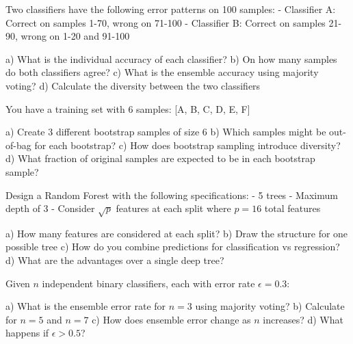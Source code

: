 \documentclass{article}
\newcounter{exercise}
\begin{document}
\begin{tcolorbox}[colback=gray!5!white,colframe=gray!75!black,title=Problem \stepcounter{exercise}: Diversity Analysis]

Two classifiers have the following error patterns on 100 samples:
- Classifier A: Correct on samples 1-70, wrong on 71-100
- Classifier B: Correct on samples 21-90, wrong on 1-20 and 91-100

a) What is the individual accuracy of each classifier?
b) On how many samples do both classifiers agree?
c) What is the ensemble accuracy using majority voting?
d) Calculate the diversity between the two classifiers
\end{tcolorbox}

\begin{tcolorbox}[colback=gray!5!white,colframe=gray!75!black,title=Problem \stepcounter{exercise}: Bootstrap Sampling]

You have a training set with 6 samples: [A, B, C, D, E, F]

a) Create 3 different bootstrap samples of size 6
b) Which samples might be out-of-bag for each bootstrap?
c) How does bootstrap sampling introduce diversity?
d) What fraction of original samples are expected to be in each bootstrap sample?
\end{tcolorbox}

\begin{tcolorbox}[colback=gray!5!white,colframe=gray!75!black,title=Problem \stepcounter{exercise}: Random Forest Construction]

Design a Random Forest with the following specifications:
- 5 trees
- Maximum depth of 3
- Consider $\sqrt{p}$ features at each split where $p=16$ total features

a) How many features are considered at each split?
b) Draw the structure for one possible tree
c) How do you combine predictions for classification vs regression?
d) What are the advantages over a single deep tree?
\end{tcolorbox}

\begin{tcolorbox}[colback=gray!5!white,colframe=gray!75!black,title=Problem \stepcounter{exercise}: Ensemble Error Analysis]

Given $n$ independent binary classifiers, each with error rate $\epsilon = 0.3$:

a) What is the ensemble error rate for $n=3$ using majority voting?
b) Calculate for $n=5$ and $n=7$
c) How does ensemble error change as $n$ increases?
d) What happens if $\epsilon > 0.5$?
\end{tcolorbox}
\end{document}
